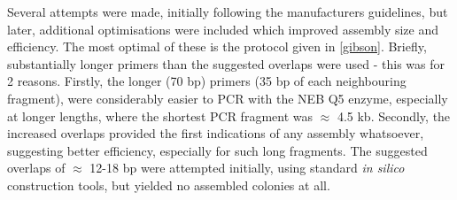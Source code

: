 Several attempts were made, initially following the manufacturers guidelines, but later, additional optimisations were included which improved assembly size and efficiency. The most optimal of these is the protocol given in \vref{gibson}. Briefly, substantially longer primers than the suggested overlaps were used - this was for 2 reasons. Firstly, the longer (70 bp) primers (35 bp of each neighbouring fragment), were considerably easier to PCR with the NEB Q5 enzyme, especially at longer lengths, where the shortest PCR fragment was $\approx$ 4.5 kb. Secondly, the increased overlaps provided the first indications of any assembly whatsoever, suggesting better efficiency, especially for such long fragments. The suggested overlaps of $\approx$ 12-18 bp were attempted initially, using standard \emph{in silico} construction tools, but yielded no assembled colonies at all.

